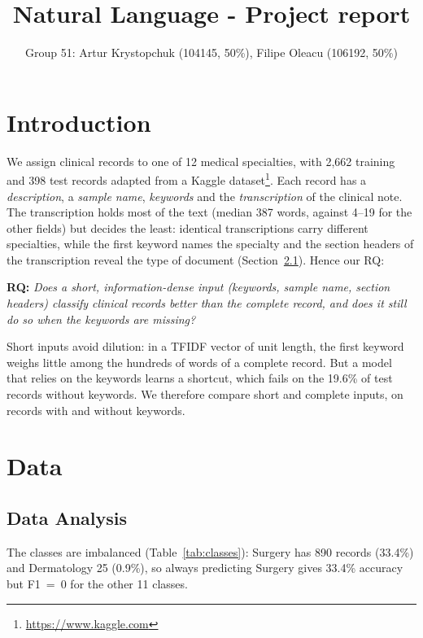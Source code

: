 \documentclass[twocolumn,10pt]{article}
\title{Natural Language - Project report}
\author{Group 51: Artur Krystopchuk (104145, 50\%), Filipe Oleacu (106192, 50\%)}
\affil{Instituto Superior Técnico, Universidade de Lisboa}
\begin{document}
\maketitle

\section{Introduction}
\label{sec:intro}

We assign clinical records to one of 12 medical specialties, with 2,662 training and 398 test records adapted from a Kaggle dataset\footnote{\raggedright\url{https://www.kaggle.com}}. Each record has a \emph{description}, a \emph{sample name}, \emph{keywords} and the \emph{transcription} of the clinical note. The transcription holds most of the text (median 387 words, against \mbox{4--19} for the other fields) but decides the least: identical transcriptions carry different specialties, while the first keyword names the specialty and the section headers of the transcription reveal the type of document (Section~\ref{sec:analysis}). Hence our \ac{RQ}:

\smallskip
\noindent\textbf{\acs{RQ}:} \emph{Does a short, information-dense input (keywords, sample name, section headers) classify clinical records better than the complete record, and does it still do so when the keywords are missing?}
\smallskip

\noindent Short inputs avoid dilution: in a \ac{TFIDF} vector of unit length, the first keyword weighs little among the hundreds of words of a complete record. But a model that relies on the keywords learns a shortcut, which fails on the 19.6\% of test records without keywords. We therefore compare short and complete inputs, on records with and without keywords.

\section{Data}
\label{sec:data}

\subsection{Data Analysis}
\label{sec:analysis}

The classes are imbalanced (Table~\ref{tab:classes}): Surgery has 890 records (33.4\%) and Dermatology 25 (0.9\%), so always predicting Surgery gives 33.4\% accuracy but F1~=~0 for the other 11 classes.
\end{document}
